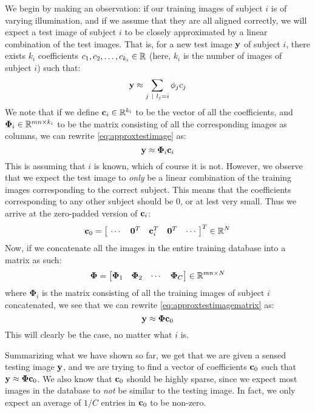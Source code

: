 We begin by making an observation: if our training images of subject $ i $ is of varying illumination, and if we assume that they are all aligned correctly, we will expect a test image of subject $ i $ to be closely approximated by a linear combination of the test images. That is, for a new test image $ \mathbf{y} $ of subject $ i $, there exists $ k_{i} $ coefficients $ c_{1}, c_{2}, \ldots, c_{k_{i}}  \in \mathbb{R} $ (here, $ k_{i} $ is the number of images of subject $ i $) such that:
\begin{equation}
	\label{eq:approxtestimage}
	\mathbf{y} \approx \sum_{j ~|~ l_{j} = i} \phi_{j}c_{j}
\end{equation}
We note that if we define $ \mathbf{c}_{i} \in \mathbb{R}^{k_{i}} $ to be the vector of all the coefficients, and $ \mathbf{\Phi}_{i} \in \mathbb{R}^{mn \times k_{i}} $ to be the matrix consisting of all the corresponding images as columns, we can rewrite \eqref{eq:approxtestimage} as:
\begin{equation}
	\label{eq:approxtestimagematrix}
	\mathbf{y} \approx \mathbf{\Phi}_{i}\mathbf{c}_{i}
\end{equation}
This is assuming that $ i $ is known, which of course it is not. However, we observe that we expect the test image to \textit{only} be a linear combination of the training images corresponding to the correct subject. This means that the coefficients corresponding to any other subject should be $ 0 $, or at lest very small. Thus we arrive at the zero-padded version of $ \mathbf{c}_{i} $:
\begin{equation*}
	\label{eq:c0def}
	\mathbf{c}_{0} = \begin{bmatrix}~\cdots & \mathbf{0}^{T} & \mathbf{c}_{i}^{T} & \mathbf{0}^{T} & \cdots~\end{bmatrix}^{T} \in \mathbb{R}^{N}
\end{equation*}
Now, if we concatenate all the images in the entire training database into a matrix as such:
\[
	\mathbf{\Phi} = \begin{bmatrix}\mathbf{\Phi}_{1} & \mathbf{\Phi}_{2} & \cdots & \mathbf{\Phi}_{C}\end{bmatrix} \in \mathbb{R}^{mn \times N}
\]
where $ \mathbf{\Phi}_{i} $ is the matrix consisting of all the training images of subject $ i $ concat\-enated, we see that we can rewrite \eqref{eq:approxtestimagematrix} as:
\begin{equation}
	\label{eq:approxtestimagefinal}
	\mathbf{y} \approx \mathbf{\Phi}\mathbf{c}_{0}
\end{equation}
This will clearly be the case, no matter what $ i $ is. 

Summarizing what we have shown so far, we get that we are given a sensed testing image $ \mathbf{y} $, and we are trying to find a vector of coefficients $ \mathbf{c}_{0} $ such that $ \mathbf{y} \approx \mathbf{\Phi}\mathbf{c}_{0} $. We also know that $ \mathbf{c}_{0} $ should be highly sparse, since we expect most images in the database to \textit{not} be similar to the testing image. In fact, we only expect an average of $ 1/C $ entries in $ \mathbf{c}_{0} $ to be non-zero. 

